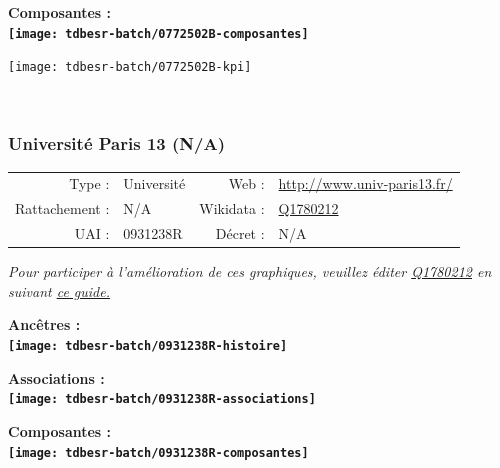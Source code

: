 \documentclass[12pt,french,]{article}
\begin{document}
\hrulefill

\begin{center} \bf Composantes : \\  
\texttt{[image: tdbesr-batch/0772502B-composantes]} \end{center}

\begin{center}\texttt{[image: tdbesr-batch/0772502B-kpi]} \end{center}\checkoddpage

\ifoddpage \fi ~\newpage  

\hypertarget{universituxe9-paris-13-na}{%
\subsubsection{Université Paris 13
(N/A)}\label{universituxe9-paris-13-na}}

\begin{tabular*}{\textwidth}{rp{5cm}rl}  
\hline  
Type : & Université & Web : &\href{http://www.univ-paris13.fr/}{http://www.univ-paris13.fr/} \\  
Rattachement : & N/A & Wikidata : & \href{https://www.wikidata.org/entity/Q1780212}{Q1780212} \\  
UAI : & 0931238R & Décret : & N/A \\  
\hline  
\end{tabular*}

\textit{\scriptsize Pour participer à l'amélioration de ces graphiques, veuillez éditer  \href{https://www.wikidata.org/entity/Q1780212}{Q1780212}  en suivant \href{https://github.com/cpesr/wikidataESR/blob/master/Rmd/wikidataESR.md}{ce guide.}}

\vspace{1cm}  
\begin{minipage}[b]{0.50\textwidth}\begin{center} \bf Ancêtres : \\  
\texttt{[image: tdbesr-batch/0931238R-histoire]} \end{center}\end{minipage}\begin{minipage}[b]{0.50\textwidth}\begin{center} \bf Associations : \\  
\texttt{[image: tdbesr-batch/0931238R-associations]} \end{center}\end{minipage}

\hrulefill

\begin{center} \bf Composantes : \\  
\texttt{[image: tdbesr-batch/0931238R-composantes]} \end{center}
\end{document}
